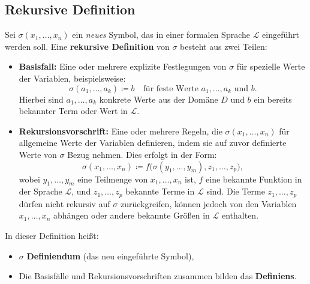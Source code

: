 \documentclass[main.tex]{subfiles}
\begin{document}
\subsection{Rekursive Definition}

\begin{definition}
Sei \(\sigma(x_1, \ldots, x_n)\) ein \emph{neues} Symbol, das in einer formalen Sprache \(\mathcal{L}\) eingeführt werden soll. Eine \textbf{rekursive Definition} von \(\sigma\) besteht aus zwei Teilen:

\begin{itemize}
    \item \textbf{Basisfall:} Eine oder mehrere explizite Festlegungen von \(\sigma\) für spezielle Werte der Variablen, beispielsweise:
    \[
    \sigma(a_1, \ldots, a_k) \coloneqq b \quad \text{für feste Werte } a_1, \ldots, a_k \text{ und } b.
    \]
    Hierbei sind \(a_1, \ldots, a_k\) konkrete Werte aus der Domäne \(D\) und \(b\) ein bereits bekannter Term oder Wert in \(\mathcal{L}\).
    
    \item \textbf{Rekursionsvorschrift:} Eine oder mehrere Regeln, die \(\sigma(x_1, \ldots, x_n)\) für allgemeine Werte der Variablen definieren, indem sie auf zuvor definierte Werte von \(\sigma\) Bezug nehmen. Dies erfolgt in der Form:
    \[
    \sigma(x_1, \ldots, x_n) \coloneqq f\big(\sigma(y_1, \ldots, y_m), z_1, \ldots, z_p\big),
    \]
    wobei \(y_1, \ldots, y_m\) eine Teilmenge von \(x_1, \ldots, x_n\) ist, \(f\) eine bekannte Funktion in der Sprache \(\mathcal{L}\), und \(z_1, \ldots, z_p\) bekannte Terme in \(\mathcal{L}\) sind. Die Terme \(z_1, \ldots, z_p\) dürfen nicht rekursiv auf \(\sigma\) zurückgreifen, können jedoch von den Variablen \(x_1, \ldots, x_n\) abhängen oder andere bekannte Größen in \(\mathcal{L}\) enthalten.
\end{itemize}

In dieser Definition heißt:
\begin{itemize}
    \item \(\sigma\) \textbf{Definiendum} (das neu eingeführte Symbol),
    \item Die Basisfälle und Rekursionsvorschriften zusammen bilden das \textbf{Definiens}.
\end{itemize}

\noindent

\end{definition}
\end{document}
